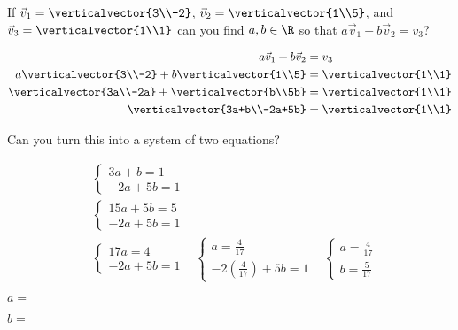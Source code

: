\documentclass{ximera}
\begin{document}
\begin{question}
  
  If $\vec{v}_1 = \verticalvector{3\\-2} $, $\vec{v}_2 = \verticalvector{1\\5}$,  and  $\vec{v}_3 = \verticalvector{1\\1}$
  can you find $a,b \in \R$ so that $a\vec{v}_1+b\vec{v}_2=v_3$?
  \begin{solution}
    \begin{hint}
      \begin{align*}
        a\vec{v}_1+b\vec{v}_2&=v_3\\
        a\verticalvector{3\\-2} +b\verticalvector{1\\5} &=  \verticalvector{1\\1}\\
        \verticalvector{3a\\-2a}+\verticalvector{b\\5b} &= \verticalvector{1\\1}\\
        \verticalvector{3a+b\\-2a+5b} &= \verticalvector{1\\1}
      \end{align*}
      
      Can you turn this into a system of two equations?
    \end{hint}
    \begin{hint}	
      \begin{align*}
        &\begin{cases}
          3a+b=1\\
          -2a+5b=1
        \end{cases}\\
        &\begin{cases}
          15a+5b= 5\\
          -2a+5b=1
        \end{cases}\\
        &\begin{cases}
          17a = 4\\
          -2a+5b=1
        \end{cases}
        &\begin{cases}
          a = \frac{4}{17}\\
          -2(\frac{4}{17})+5b =1
        \end{cases}
        &\begin{cases}
          a = \frac{4}{17}\\
          b = \frac{5}{17}
        \end{cases}
      \end{align*}
    \end{hint}
    $a = $
  \end{solution}
  \begin{solution}
    $b=$ 
  \end{solution}
\end{question}
 	
\end{document}
